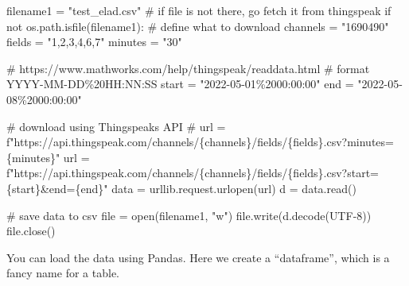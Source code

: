 \documentclass[
  letterpaper,
  DIV=11,
  numbers=noendperiod,
  oneside]{scrreprt}
\newenvironment{Shaded}{\begin{snugshade}}{\end{snugshade}}
\newcommand{\BuiltInTok}[1]{\textcolor[rgb]{0.00,0.23,0.31}{#1}}
\newcommand{\CommentTok}[1]{\textcolor[rgb]{0.37,0.37,0.37}{#1}}
\newcommand{\ControlFlowTok}[1]{\textcolor[rgb]{0.00,0.23,0.31}{#1}}
\newcommand{\KeywordTok}[1]{\textcolor[rgb]{0.00,0.23,0.31}{#1}}
\newcommand{\NormalTok}[1]{\textcolor[rgb]{0.00,0.23,0.31}{#1}}
\newcommand{\OperatorTok}[1]{\textcolor[rgb]{0.37,0.37,0.37}{#1}}
\newcommand{\SpecialCharTok}[1]{\textcolor[rgb]{0.37,0.37,0.37}{#1}}
\newcommand{\SpecialStringTok}[1]{\textcolor[rgb]{0.13,0.47,0.30}{#1}}
\newcommand{\StringTok}[1]{\textcolor[rgb]{0.13,0.47,0.30}{#1}}
\begin{document}
\begin{Shaded}
\begin{Highlighting}[]
\NormalTok{filename1 }\OperatorTok{=} \StringTok{"test\_elad.csv"}
\CommentTok{\# if file is not there, go fetch it from thingspeak}
\ControlFlowTok{if} \KeywordTok{not}\NormalTok{ os.path.isfile(filename1):}
    \CommentTok{\# define what to download}
\NormalTok{    channels }\OperatorTok{=} \StringTok{"1690490"}
\NormalTok{    fields }\OperatorTok{=} \StringTok{"1,2,3,4,6,7"}
\NormalTok{    minutes }\OperatorTok{=} \StringTok{"30"}

    \CommentTok{\# https://www.mathworks.com/help/thingspeak/readdata.html}
    \CommentTok{\# format YYYY{-}MM{-}DD\%20HH:NN:SS}
\NormalTok{    start }\OperatorTok{=} \StringTok{"2022{-}05{-}01\%2000:00:00"}
\NormalTok{    end }\OperatorTok{=} \StringTok{"2022{-}05{-}08\%2000:00:00"}

    \CommentTok{\# download using Thingspeak\textquotesingle{}s API}
    \CommentTok{\# url = f"https://api.thingspeak.com/channels/\{channels\}/fields/\{fields\}.csv?minutes=\{minutes\}"}
\NormalTok{    url }\OperatorTok{=} \SpecialStringTok{f"https://api.thingspeak.com/channels/}\SpecialCharTok{\{}\NormalTok{channels}\SpecialCharTok{\}}\SpecialStringTok{/fields/}\SpecialCharTok{\{}\NormalTok{fields}\SpecialCharTok{\}}\SpecialStringTok{.csv?start=}\SpecialCharTok{\{}\NormalTok{start}\SpecialCharTok{\}}\SpecialStringTok{\&end=}\SpecialCharTok{\{}\NormalTok{end}\SpecialCharTok{\}}\SpecialStringTok{"}
\NormalTok{    data }\OperatorTok{=}\NormalTok{ urllib.request.urlopen(url)}
\NormalTok{    d }\OperatorTok{=}\NormalTok{ data.read()}

    \CommentTok{\# save data to csv}
    \BuiltInTok{file} \OperatorTok{=} \BuiltInTok{open}\NormalTok{(filename1, }\StringTok{"w"}\NormalTok{)}
    \BuiltInTok{file}\NormalTok{.write(d.decode(}\StringTok{\textquotesingle{}UTF{-}8\textquotesingle{}}\NormalTok{))}
    \BuiltInTok{file}\NormalTok{.close()}
\end{Highlighting}
\end{Shaded}

You can load the data using Pandas. Here we create a ``dataframe'',
which is a fancy name for a table.
\end{document}
